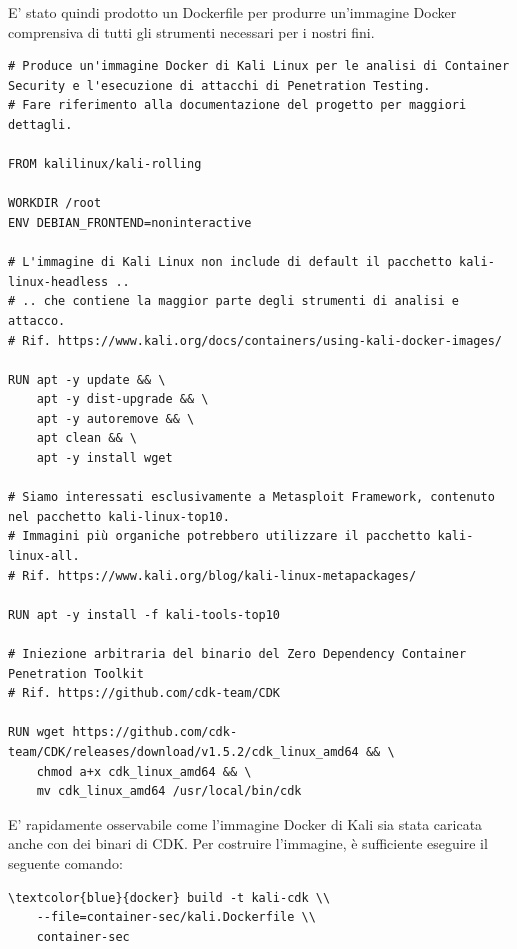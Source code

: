 E' stato quindi prodotto un Dockerfile per produrre un'immagine Docker comprensiva di tutti gli strumenti necessari per i nostri fini.

\begin{code}
\label{code:apx:a:dockerfile}
\begin{verbatim}
# Produce un'immagine Docker di Kali Linux per le analisi di Container Security e l'esecuzione di attacchi di Penetration Testing.
# Fare riferimento alla documentazione del progetto per maggiori dettagli.

FROM kalilinux/kali-rolling

WORKDIR /root
ENV DEBIAN_FRONTEND=noninteractive

# L'immagine di Kali Linux non include di default il pacchetto kali-linux-headless ..
# .. che contiene la maggior parte degli strumenti di analisi e attacco.
# Rif. https://www.kali.org/docs/containers/using-kali-docker-images/

RUN apt -y update && \
    apt -y dist-upgrade && \
    apt -y autoremove && \
    apt clean && \
    apt -y install wget

# Siamo interessati esclusivamente a Metasploit Framework, contenuto nel pacchetto kali-linux-top10.
# Immagini più organiche potrebbero utilizzare il pacchetto kali-linux-all.
# Rif. https://www.kali.org/blog/kali-linux-metapackages/

RUN apt -y install -f kali-tools-top10

# Iniezione arbitraria del binario del Zero Dependency Container Penetration Toolkit
# Rif. https://github.com/cdk-team/CDK

RUN wget https://github.com/cdk-team/CDK/releases/download/v1.5.2/cdk_linux_amd64 && \
    chmod a+x cdk_linux_amd64 && \
    mv cdk_linux_amd64 /usr/local/bin/cdk
\end{verbatim}
\end{code}

E' rapidamente osservabile come l'immagine Docker di Kali sia stata caricata anche con dei binari di CDK. Per costruire l'immagine, è sufficiente eseguire il seguente comando:

\begin{small}
\begin{Verbatim}[commandchars=\\\{\}]
\textcolor{blue}{docker} build -t kali-cdk \\ 
    --file=container-sec/kali.Dockerfile \\ 
    container-sec
\end{Verbatim}
\end{small}

